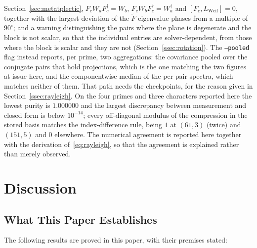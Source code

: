 \documentclass[11pt,a4paper]{article}
\begin{document}
    Section~\ref{sec:metatplectic}, $F_c W_a F_c^\dagger = W_b$, $F_c W_b F_c^\dagger = W_a^\dagger$
    and $[F_c, L_{\mathrm{Weil}}] = 0$, together with the largest deviation of the $\tilde F$
    eigenvalue phases from a multiple of $90^\circ$; and a warning distinguishing the pairs where
    the plane is
    degenerate and the block is not scalar, so that the individual entries are solver-dependent,
    from those where the block is scalar and they are not (Section~\ref{ssec:rotation}).
    The \texttt{--pooled} flag instead reports, per prime, two aggregations: the covariance pooled
    over the conjugate pairs that hold projections, which is the one matching the two figures at
    issue here, and the componentwise median of the per-pair spectra, which matches neither of them.
    That path needs the checkpoints, for the reason given in Section~\ref{ssec:rayleigh}.
    On the four primes and three characters reported here the lowest purity is $1.000000$ and the
    largest discrepancy between measurement and closed form is below $10^{-14}$; every
    off-diagonal modulus of the compression in the stored basis matches the index-difference rule,
    being $1$ at $(61,3)$ (twice) and $(151,5)$ and $0$ elsewhere.
    The numerical agreement is reported here together with the derivation
    of~\eqref{eq:rayleigh}, so that the agreement is explained rather than merely observed.

    \clearpage
  \section{Discussion}
  \label{sec:disc}

  \subsection{What This Paper Establishes}

    The following results are proved in this paper, with their premises stated:
\end{document}
